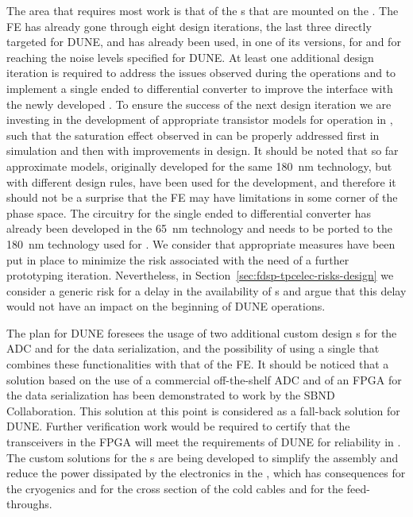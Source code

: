 The area that requires most work is that of the s that are mounted
on the . The FE  has already gone through eight design
iterations, the last three directly targeted for DUNE, and has already been used, 
in one of its versions, for  and for  reaching the 
noise levels specified for DUNE. At least one additional design iteration is
required to address the issues observed during the  operations and
to implement a single ended to differential converter to improve the interface
with the newly developed . To ensure the success of the next 
design iteration we are investing in the development of appropriate transistor
models for operation in \lar, such that the saturation effect observed in 
 can be properly addressed first in simulation and then with improvements 
in design. It should be noted that so far approximate models, originally developed for 
the same \SI{180}{nm} technology, but with different design rules, have been used for 
the  development, and therefore it should not be a surprise
that the FE  may have limitations in some corner of the phase space.
The circuitry for the single ended to differential converter has already been 
developed in the \SI{65}{nm} technology and needs to be ported to the \SI{180}{nm}
technology used for . We consider that appropriate measures have been
put in place to minimize the risk associated with the need of a further
prototyping iteration. Nevertheless, in Section~\ref{sec:fdsp-tpcelec-risks-design}
we consider a generic risk for a delay in the availability of s and
argue that this delay would not have an impact on the beginning of DUNE operations.

The plan for DUNE foresees the usage of two additional custom design s
for the ADC and for the data serialization, and the possibility of using a single 
 that combines these functionalities with that of the FE. It should
be noticed that a solution based on the use of a commercial off-the-shelf ADC 
and of an FPGA for the data serialization has been demonstrated to work by the 
SBND Collaboration. This solution at this point is considered as a fall-back
solution for DUNE. Further verification work would be required to certify that
the transceivers in the FPGA will meet the requirements of DUNE for reliability
in \lar. The custom solutions for the s are being developed to
simplify the  assembly and reduce the power dissipated by the
electronics in the \lar, which has consequences for the cryogenics and for
the cross section of the cold cables and for the feed-throughs.

